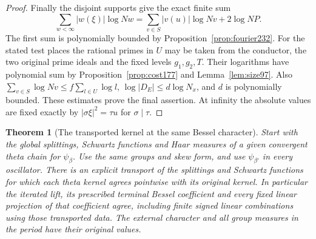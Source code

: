 \documentclass[a4paper,11pt]{article}
\newtheorem{theorem}[proposition]{Theorem}
\theoremstyle{definition}
\theoremstyle{remark}
\numberwithin{equation}{section}
\begin{document}
\begin{proof}
Finally the disjoint supports give the exact finite sum
\[
  \sum_{w<\infty}|w(\xi)|\log Nw
      =\sum_{v\in S}|v(u)|\log Nv+2\log NP.
\]
The first sum is polynomially bounded by Proposition~\ref{prop:fourier232}. For the stated test places the
rational primes in \(U\) may be taken from the conductor, the two
original prime ideals and the fixed levels \(g_1,g_2,T\). Their
logarithms have polynomial sum by Proposition~\ref{prop:cost177}
and Lemma~\ref{lem:size97}. Also
\(\sum_{v\in S}\log Nv\le f\sum_{l\in U}\log l\),
\(\log |D_E|\le d\log N_x\), and \(d\) is polynomially bounded.
These estimates prove the final assertion. At infinity the absolute
values are fixed exactly by \(|\sigma\xi|^2=\tau u\) for
\(\sigma\mid\tau\).
\end{proof}

\begin{theorem}[The transported kernel at the same Bessel character]
\label{thm:transport233}
Start with the global splittings, Schwartz functions and Haar measures
of a given convergent theta chain for \(\psi_\beta\). Use the same
groups and skew form, and use \(\psi_{\beta'}\) in every oscillator.
There is an explicit transport of the splittings and Schwartz functions
for which each theta kernel agrees pointwise with its original kernel.
In particular the iterated lift, its prescribed terminal Bessel
coefficient and every fixed linear projection of that coefficient
agree, including finite signed linear combinations using those
transported data. The external character and all group measures in
the period have their original values.
\end{theorem}
\end{document}
